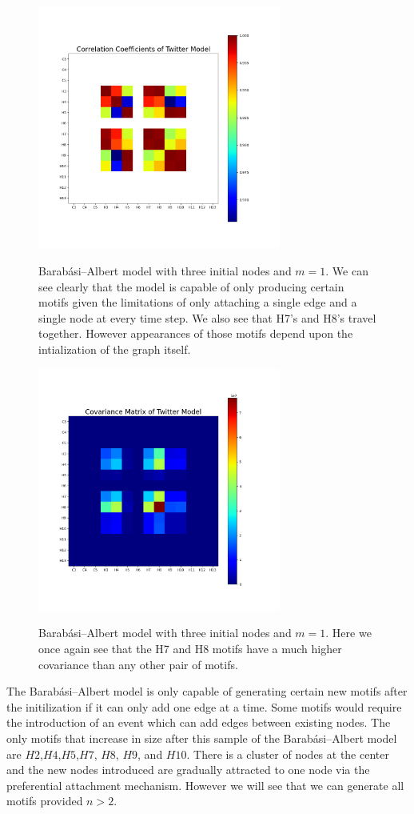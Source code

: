 \begin{figure}
    \includegraphics[width=8cm]{Images/CorrCoefPreferentialAttachmentModel.png}\
    \centering
    \caption{Barabási–Albert model with three initial nodes and $m=1$. We can see clearly that
    the model is capable of only producing certain motifs given the limitations of only 
    attaching a single edge and a single node at every time step. We also see that 
    H7's and H8's travel together. However appearances of those motifs depend upon the intialization
    of the graph itself.}
\end{figure}

\begin{figure}
    \includegraphics[width=08cm]{Images/CovMatPreferentialAttachmentModel.png}\
    \centering
    \caption{Barabási–Albert model with three initial nodes and $m=1$. Here we once again see that 
    the H7 and H8 motifs have a much higher covariance than any other pair of motifs.}
\end{figure}


The Barabási–Albert model is only capable of generating certain new motifs after the initilization if 
it can only add one edge at a time. Some motifs would require the introduction of an event
which can add edges between existing nodes. The only motifs that increase in size after this
sample of the Barabási–Albert model are $H2$,$H4$,$H5$,$H7$, $H8$, $H9$, and $H10$. There is a cluster
of nodes at the center and the new nodes introduced are gradually attracted to one node via the 
preferential attachment mechanism. However we will see that we can generate all motifs provided
$n>2$.


